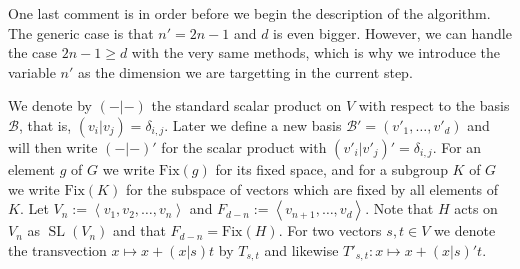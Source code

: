\documentclass[a4paper,11pt]{article}
\def\SL{\operatorname{SL}}
\newcommand{\Fix}[1]{\mathrm{Fix}(#1)}
\newcommand{\B}{\mathcal{B}}
\begin{document}
One last comment is in order before we begin the description of the
algorithm. The generic case is that $n'=2n-1$ and $d$ is even bigger.
However, we can handle the case $2n-1 \ge d$ with the very same
methods, which is why we introduce the variable $n'$ as the dimension
we are targetting in the current step.

We denote by $(-|-)$
the standard scalar product on $V$ with respect to the basis $\B$,
that is, $(v_i|v_j) = \delta_{i,j}$. Later we define a new basis 
$\B' = (v'_1, \ldots, v'_d)$ and will then write $(-|-)'$ for the scalar
product with $(v'_i|v'_j)' = \delta_{i,j}$.
For an element $g$ of $G$ we write
$\Fix g$ for its fixed space, and for a subgroup $K$ of $G$ we write
$\Fix K$ for the subspace of vectors which are fixed by all elements
of $K$.
Let $V_n := \left< v_1, v_2, \ldots, v_n\right>$ and $F_{d-n} :=
\left< v_{n+1}, \ldots, v_d \right>$. Note that $H$ acts on $V_n$ as
$\SL(V_n)$ and that $F_{d-n} = \Fix H$.
For two vectors $s,t \in V$ we denote the transvection $x \mapsto x + (x|s)t$
by $T_{s,t}$ and likewise $T'_{s,t} : x \mapsto x + (x|s)'t$.
\end{document}
